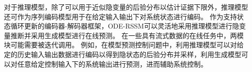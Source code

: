 对于推理模型，除了可以用于近似隐变量的后验分布以估计证据下限外，推理模型还可作为序列编码模型用于在给定输入输出下对系统状态进行编码。
作为支持状态循环更新的编码器-解码器框架，ODE-RSSM可以灵活地采用推理模型进行隐变量推断并采用生成模型进行在线预测。
在一些具有流式数据的在线任务中，两模块可能需要被迭代调用。
例如，在模型预测控制问题中，利用推理模型可以对给定的历史输入输出数据进行编码以得到隐状态的后验分布并采样，利用生成模型可以对任意给定控制输入下的系统输出进行预测，进而辅助系统控制。








